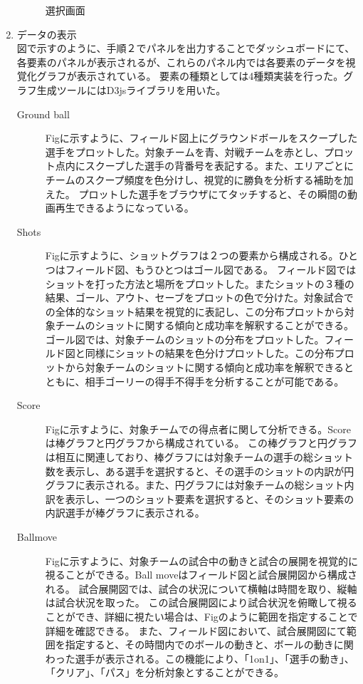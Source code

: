 \documentclass[sotsuron]{kuee}
\begin{document}
\begin{enumerate}
\begin{figure}
\begin{center}
					\end{center}
					\caption{選択画面}
			  		\label{fig:select}
				\end{figure}
			\item データの表示
				\\図で示すのように、手順２でパネルを出力することでダッシュボードにて、各要素のパネルが表示されるが、これらのパネル内では各要素のデータを視覚化グラフが表示されている。
				要素の種類としては4種類実装を行った。グラフ生成ツールにはD3jsライブラリを用いた。
				\begin{description}
					\item [Ground ball]
					Figに示すように、フィールド図上にグラウンドボールをスクープした選手をプロットした。対象チームを青、対戦チームを赤とし、プロット点内にスクープした選手の背番号を表記する。また、エリアごとにチームのスクープ頻度を色分けし、視覚的に勝負を分析する補助を加えた。
					プロットした選手をブラウザにてタッチすると、その瞬間の動画再生できるようになっている。
					\item [Shots]
					Figに示すように、ショットグラフは２つの要素から構成される。ひとつはフィールド図、もうひとつはゴール図である。
					フィールド図ではショットを打った方法と場所をプロットした。またショットの３種の結果、ゴール、アウト、セーブをプロットの色で分けた。対象試合での全体的なショット結果を視覚的に表記し、この分布プロットから対象チームのショットに関する傾向と成功率を解釈することができる。
					ゴール図では、対象チームのショットの分布をプロットした。フィールド図と同様にショットの結果を色分けプロットした。この分布プロットから対象チームのショットに関する傾向と成功率を解釈できるとともに、相手ゴーリーの得手不得手を分析することが可能である。
					\item [Score]
					Figに示すように、対象チームでの得点者に関して分析できる。Scoreは棒グラフと円グラフから構成されている。
					この棒グラフと円グラフは相互に関連しており、棒グラフには対象チームの選手の総ショット数を表示し、ある選手を選択すると、その選手のショットの内訳が円グラフに表示される。また、円グラフには対象チームの総ショット内訳を表示し、一つのショット要素を選択すると、そのショット要素の内訳選手が棒グラフに表示される。
					\item [Ballmove]
					Figに示すように、対象チームの試合中の動きと試合の展開を視覚的に視ることができる。Ball moveはフィールド図と試合展開図から構成される。
					試合展開図では、試合の状況について横軸は時間を取り、縦軸は試合状況を取った。
					この試合展開図により試合状況を俯瞰して視ることができ、詳細に視たい場合は、Figのように範囲を指定することで詳細を確認できる。
					また、フィールド図において、試合展開図にて範囲を指定すると、その時間内でのボールの動きと、ボールの動きに関わった選手が表示される。この機能により、「1on1」、「選手の動き」、「クリア」、「パス」を分析対象とすることができる。

\end{description}
\end{enumerate}
\end{document}
